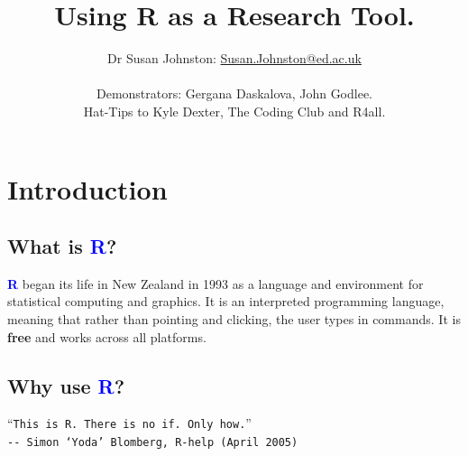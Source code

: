 \documentclass[a4paper,12pt]{article}
\newcommand\boldblue[1]{\textcolor{blue}{\textbf{#1}}}
\begin{document}





\title{Using R as a Research Tool.}
\author{Dr Susan Johnston: \href{mailto:Susan.Johnston@ed.ac.uk}{Susan.Johnston@ed.ac.uk}  \\ \\
        Demonstrators: Gergana Daskalova, John Godlee. \\
        Hat-Tips to Kyle Dexter, The Coding Club and R4all.}









\maketitle



\section {Introduction}

\subsection {What is \boldblue{R}?}

\boldblue{R} began its life in New Zealand in 1993 as a language and environment for statistical computing and graphics. It is an interpreted programming language, meaning that rather than pointing and clicking, the user types in commands. It is \textbf{free} and works across all platforms.


\subsection {Why use \boldblue{R}?}

\begin{center}
``\texttt{This is R. There is no if. Only how.}'' \\
\texttt{{-}{-} Simon `Yoda' Blomberg, R-help (April 2005)}

\end{center}
\end{document}
